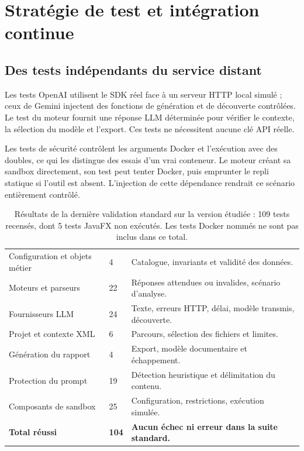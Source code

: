 \section{Stratégie de test et intégration continue}
\label{sec:tests}
\subsection{Des tests indépendants du service distant}
Les tests OpenAI utilisent le SDK réel face à un serveur HTTP local simulé ; ceux de Gemini injectent des fonctions de génération et de découverte contrôlées. Le test du moteur fournit une réponse LLM déterminée pour vérifier le contexte, la sélection du modèle et l'export. Ces tests ne nécessitent aucune clé API réelle.

Les tests de sécurité contrôlent les arguments Docker et l'exécution avec des doubles, ce qui les distingue des essais d'un vrai conteneur. Le moteur créant sa sandbox directement, son test peut tenter Docker, puis emprunter le repli statique si l'outil est absent. L'injection de cette dépendance rendrait ce scénario entièrement contrôlé.

\begin{table}[H]
\small
\begin{tabularx}{\textwidth}{@{}YP{19mm}P{64mm}@{}}
\toprule
{} &  & \\
\midrule
Configuration et objets métier & 4 & Catalogue, invariants et validité des données.\\
Moteurs et parseurs & 22 & Réponses attendues ou invalides, scénario d'analyse.\\
Fournisseurs LLM & 24 & Texte, erreurs HTTP, délai, modèle transmis, découverte.\\
Projet et contexte XML & 6 & Parcours, sélection des fichiers et limites.\\
Génération du rapport & 4 & Export, modèle documentaire et échappement.\\
Protection du prompt & 19 & Détection heuristique et délimitation du contenu.\\
Composants de sandbox & 25 & Configuration, restrictions, exécution simulée.\\
\midrule
\textbf{Total réussi} & \textbf{104} & \textbf{Aucun échec ni erreur dans la suite standard.}\\
\bottomrule
\end{tabularx}
\caption{Résultats de la dernière validation standard sur la version étudiée : 109 tests recensés, dont 5 tests JavaFX non exécutés. Les tests Docker nommés  ne sont pas inclus dans ce total.}
\end{table}

